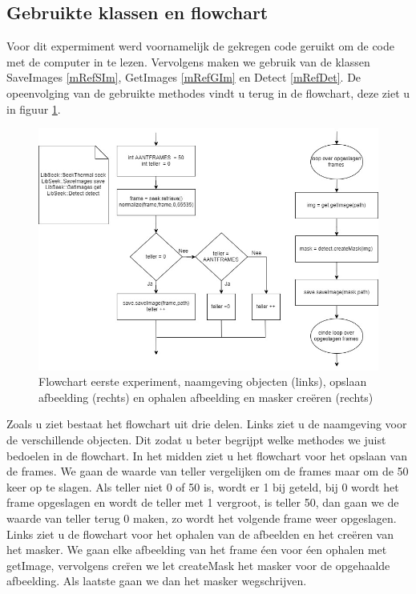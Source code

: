 \subsection{Gebruikte klassen en flowchart}
\label{ERefOBF}
Voor dit expermiment werd voornamelijk de gekregen code geruikt om de code met de computer in te lezen. Vervolgens maken we gebruik van de klassen SaveImages \ref{mRefSIm}, GetImages \ref{mRefGIm} en Detect \ref{mRefDet}. De opeenvolging van de gebruikte methodes vindt u terug in de flowchart, deze ziet u in figuur \ref{imgFCEEx}.
\begin{figure}[hbp]
	\includegraphics[scale=0.45]{FlowChart_EersteExperiment}
	\caption{Flowchart eerste experiment, naamgeving objecten (links), opslaan afbeelding (rechts) en ophalen afbeelding en masker cre\"eren (rechts)}
	\label{imgFCEEx}
\end{figure}
Zoals u ziet bestaat het flowchart uit drie delen. Links ziet u de naamgeving voor de verschillende objecten. Dit zodat u beter begrijpt welke methodes we juist bedoelen in de flowchart. In het midden ziet u het flowchart voor het opslaan van de frames. We gaan de waarde van teller vergelijken om de frames maar om de 50 keer op te slagen. Als teller niet 0 of 50 is, wordt er 1 bij geteld, bij 0 wordt het frame opgeslagen en wordt de teller met 1 vergroot, is teller 50, dan gaan we de waarde van teller terug 0 maken, zo wordt het volgende frame weer opgeslagen. Links ziet u de flowchart voor het ophalen van de afbeelden en het cre\"eren van het masker. We gaan elke afbeelding van het frame \'{ee}n voor \'{ee}n ophalen met getImage, vervolgens cre\"ren we let createMask het masker voor de opgehaalde afbeelding. Als laatste gaan we dan het masker wegschrijven. 

